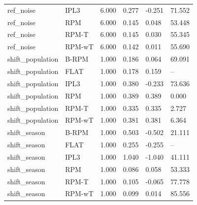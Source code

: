 \begin{tabular}{llllll}
ref\_noise & IPL3 & 6.000 & 0.277 & -0.251 & 71.552 \\
ref\_noise & RPM & 6.000 & 0.145 & 0.048 & 53.448 \\
ref\_noise & RPM-T & 6.000 & 0.145 & 0.030 & 55.345 \\
ref\_noise & RPM-wT & 6.000 & 0.142 & 0.011 & 55.690 \\
shift\_population & B-RPM & 1.000 & 0.186 & 0.064 & 69.091 \\
shift\_population & FLAT & 1.000 & 0.178 & 0.159 & – \\
shift\_population & IPL3 & 1.000 & 0.380 & -0.233 & 73.636 \\
shift\_population & RPM & 1.000 & 0.389 & 0.389 & 0.000 \\
shift\_population & RPM-T & 1.000 & 0.335 & 0.335 & 2.727 \\
shift\_population & RPM-wT & 1.000 & 0.381 & 0.381 & 6.364 \\
shift\_season & B-RPM & 1.000 & 0.503 & -0.502 & 21.111 \\
shift\_season & FLAT & 1.000 & 0.255 & -0.255 & – \\
shift\_season & IPL3 & 1.000 & 1.040 & -1.040 & 41.111 \\
shift\_season & RPM & 1.000 & 0.086 & 0.058 & 53.333 \\
shift\_season & RPM-T & 1.000 & 0.105 & -0.065 & 77.778 \\
shift\_season & RPM-wT & 1.000 & 0.099 & 0.014 & 85.556 \\
\hline
\end{tabular}
